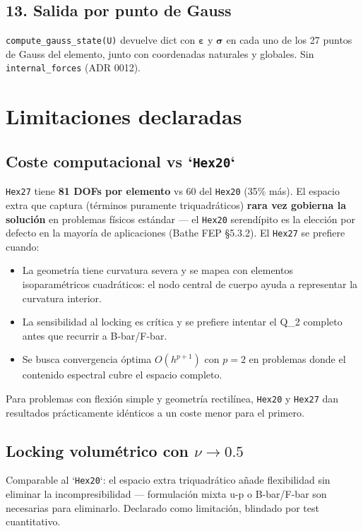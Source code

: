 \documentclass[11pt,letterpaper,oneside]{report}
\begin{document}
\subsection{13. Salida por punto de Gauss}

\texttt{compute\_gauss\_state(U)} devuelve dict con $\boldsymbol\varepsilon$ y $\boldsymbol\sigma$ en cada uno de los 27 puntos de Gauss del elemento, junto con coordenadas naturales y globales. Sin \texttt{internal\_forces} (ADR 0012).


\section{Limitaciones declaradas}

\subsection{Coste computacional vs `\texttt{Hex20}`}

\texttt{Hex27} tiene \textbf{81 DOFs por elemento} vs 60 del \texttt{Hex20} (35\% más). El espacio extra que captura (términos puramente triquadráticos) \textbf{rara vez gobierna la solución} en problemas físicos estándar --- el \texttt{Hex20} serendípito es la elección por defecto en la mayoría de aplicaciones (Bathe FEP §5.3.2). El \texttt{Hex27} se prefiere cuando:

\begin{itemize}
  \item La geometría tiene curvatura severa y se mapea con elementos isoparamétricos cuadráticos: el nodo central de cuerpo ayuda a representar la curvatura interior.
  \item La sensibilidad al locking es crítica y se prefiere intentar el Q\_2 completo antes que recurrir a B-bar/F-bar.
  \item Se busca convergencia óptima $O(h^{p+1})$ con $p = 2$ en problemas donde el contenido espectral cubre el espacio completo.
\end{itemize}

Para problemas con flexión simple y geometría rectilínea, \texttt{Hex20} y \texttt{Hex27} dan resultados prácticamente idénticos a un coste menor para el primero.

\subsection{Locking volumétrico con $\nu \to 0.5$}

Comparable al `\texttt{Hex20}`: el espacio extra triquadrático añade flexibilidad sin eliminar la incompresibilidad --- formulación mixta u-p o B-bar/F-bar son necesarias para eliminarlo. Declarado como limitación, blindado por test cuantitativo.
\end{document}
